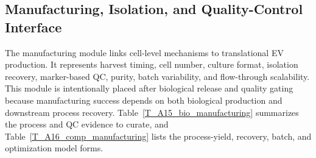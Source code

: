 \subsection*{Manufacturing, Isolation, and Quality-Control Interface}

The manufacturing module links cell-level mechanisms to translational EV production. It represents harvest timing, cell number, culture format, isolation recovery, marker-based QC, purity, batch variability, and flow-through scalability. This module is intentionally placed after biological release and quality gating because manufacturing success depends on both biological production and downstream process recovery. Table~\ref{T_A15_bio_manufacturing} summarizes the process and QC evidence to curate, and Table~\ref{T_A16_comp_manufacturing} lists the process-yield, recovery, batch, and optimization model forms.

